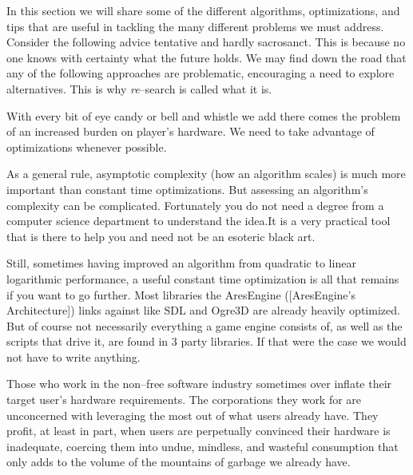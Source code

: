 
    {}

In this section we will share some of the different algorithms, optimizations, and tips that are useful in tackling the many different problems we must address. Consider the following advice tentative and hardly sacrosanct. This is because no one knows with certainty what the future holds. We may find down the road that any of the following approaches are problematic, encouraging a need to explore alternatives. This is why {\it re}--search is called what it is.

With every bit of eye candy or bell and whistle we add there comes the problem of an increased burden on player's hardware. We need to take advantage of optimizations whenever possible. 

As a general rule, asymptotic complexity (how an algorithm scales) is much more important than constant time optimizations. But assessing an algorithm's complexity can be complicated. Fortunately you do not need a degree from a computer science department to understand the idea. It is a very practical tool that is there to help you and need not be an esoteric black art.

Still, sometimes having improved an algorithm from quadratic to linear logarithmic performance, a useful constant time optimization is all that remains if you want to go further. Most libraries the AresEngine ([AresEngine's Architecture]) links against like SDL and Ogre3D are already heavily optimized. But of course not necessarily everything a game engine consists of, as well as the scripts that drive it, are found in 3 party libraries. If that were the case we would not have to write anything.

Those who work in the non--free software industry sometimes over inflate their target user's hardware requirements. The corporations they work for are unconcerned with leveraging the most out of what users already have. They profit, at least in part, when users are perpetually convinced their hardware is inadequate, coercing them into undue, mindless, and wasteful consumption that only adds to the volume of the mountains of garbage we already have.\footnotecite[caroll2008] 

